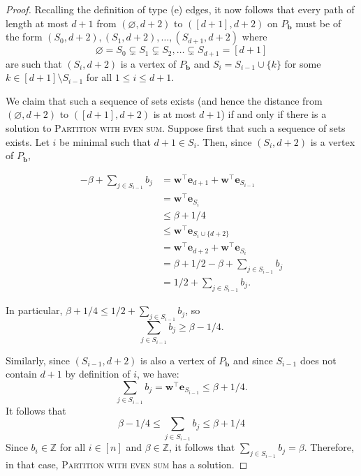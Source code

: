\documentclass[centering,11pt,reqno]{amsart}
\theoremstyle{definition}
\renewcommand{\emptyset}{\varnothing}
\begin{document}
\begin{proof}
Recalling the definition of type (e) edges, it now follows that every path of length at most $d+1$ from $(\emptyset, d+2)$ to $([d+1], d+2)$ on $P_\mathbf{b}$ must be of the form $(S_0,d+2),(S_1,d+2),\ldots,(S_{d+1},d+2)$ where \[\emptyset = S_{0} \subsetneq  S_{1} \subsetneq S_{2}, \dots \subsetneq S_{d+1} = [d+1]\] are such that $(S_{i},d+2)$ is a vertex of $P_\mathbf{b}$ and $S_{i} = S_{i-1} \cup \{k\}$ for some $k \in [d+1] \setminus S_{i-1}$ for all $1\le i \le d+1$.

We claim that such a sequence of sets exists (and hence the distance from $(\emptyset,d+2)$ to $([d+1],d+2)$ is at most $d+1$) if and only if there is a solution to \textsc{Partition with even sum}. Suppose first that such a sequence of sets exists. Let $i$ be minimal such that $d+1 \in S_{i}$. Then, since $(S_{i}, d+2)$ is a vertex of $P_{\mathbf{b}}$,

\begin{align*}
 -\beta +\sum_{j \in S_{i-1}} b_{j} &= \mathbf{w}^{\intercal}\mathbf{e}_{d+1} + \mathbf{w}^{\intercal} \mathbf{e}_{S_{i-1}}\\
 &= \mathbf{w}^{\intercal} \mathbf{e}_{S_{i}} \\
 &\leq \beta + 1/4 \\
 &\leq \mathbf{w}^{\intercal}\mathbf{e}_{S_{i} \cup \{d+2\}} \\
 &= \mathbf{w}^{\intercal} \mathbf{e}_{d+2} + \mathbf{w}^{\intercal} \mathbf{e}_{S_{i}} \\
 &=  \beta + 1/2 - \beta + \sum_{j \in S_{i-1}} b_{j} \\
 &= 1/2 + \sum_{j \in S_{i-1}} b_{j}.      
\end{align*}

In particular, $\beta + 1/4 \leq 1/2 + \sum_{j \in S_{i-1}} b_{j}$, so
\[\sum_{j \in S_{i-1}} b_{j} \geq \beta -1/4.\]

Similarly, since $(S_{i-1},d+2)$ is also a vertex of $P_{\mathbf{b}}$ and since $S_{i-1}$ does not contain $d+1$ by definition of $i$, we have:
\[\sum_{j \in S_{i-1}}b_{j} = \mathbf{w}^{\intercal}\mathbf{e}_{S_{i-1}} \leq \beta + 1/4.\]
It follows that 
\[\beta - 1/4 \leq \sum_{j \in S_{i-1}} b_{j} \leq \beta + 1/4\]
Since $b_{i} \in \mathbb{Z}$ for all $i \in [n]$ and $\beta\in \mathbb{Z}$, it follows that $\sum_{j \in S_{i-1}} b_{j} = \beta$. Therefore, in that case, \textsc{Partition with even sum} has a solution.


\end{proof}
\end{document}
